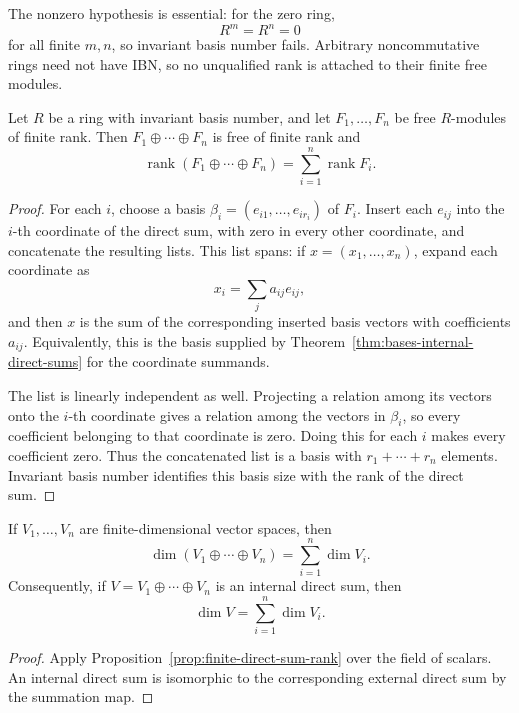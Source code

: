 The nonzero hypothesis is essential: for the zero ring,
\[
R^m=R^n=0
\]
for all finite \(m,n\), so invariant basis number fails.  Arbitrary
noncommutative rings need not have IBN, so no unqualified rank is attached to
their finite free modules.

\begin{proposition}
\label{prop:finite-direct-sum-rank}
Let \(R\) be a ring with invariant basis number, and let
\(F_1,\ldots,F_n\) be free \(R\)-modules of finite rank. Then
\(F_1\oplus\cdots\oplus F_n\) is free of finite rank and
\[
\operatorname{rank}(F_1\oplus\cdots\oplus F_n)
=\sum_{i=1}^n\operatorname{rank}F_i.
\]
\end{proposition}
\begin{proof}
For each \(i\), choose a basis
\(\beta_i=(e_{i1},\ldots,e_{ir_i})\) of \(F_i\). Insert each \(e_{ij}\)
into the \(i\)-th coordinate of the direct sum, with zero in every other
coordinate, and concatenate the resulting lists. This list spans: if
\(x=(x_1,\ldots,x_n)\), expand each coordinate as
\[
x_i=\sum_j a_{ij}e_{ij},
\]
and then \(x\) is the sum of the corresponding
  inserted basis vectors with coefficients \(a_{ij}\). Equivalently, this is
  the basis supplied by Theorem~\ref{thm:bases-internal-direct-sums} for the
  coordinate summands.

The list is linearly independent as well. Projecting a relation among its
vectors onto the \(i\)-th coordinate gives a relation among the vectors in
\(\beta_i\), so every coefficient belonging to that coordinate is zero.
Doing this for each \(i\) makes every coefficient zero. Thus the concatenated
list is a basis with \(r_1+\cdots+r_n\) elements. Invariant basis number
identifies this basis size with the rank of the direct sum.
\end{proof}

\begin{corollary}
\label{cor:finite-direct-sum-dimension}
If \(V_1,\ldots,V_n\) are finite-dimensional vector spaces, then
\[
\dim(V_1\oplus\cdots\oplus V_n)=\sum_{i=1}^n\dim V_i.
\]
Consequently, if \(V=V_1\oplus\cdots\oplus V_n\) is an internal direct sum,
then
\[
\dim V=\sum_{i=1}^n\dim V_i.
\]
\end{corollary}
\begin{proof}
Apply Proposition~\ref{prop:finite-direct-sum-rank} over the field of
scalars. An internal direct sum is isomorphic to the corresponding external
direct sum by the summation map.
\end{proof}

